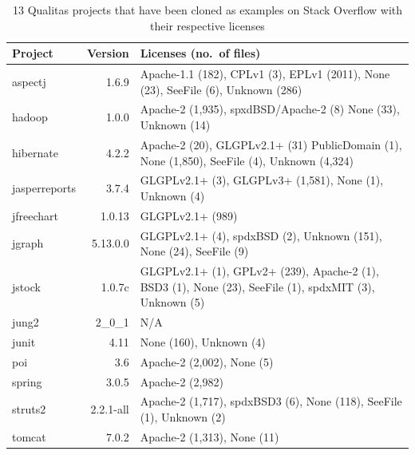 \documentclass{sig-alternate-05-2015}
\begin{document}
\begin{table}
	\centering
	\caption{13 Qualitas projects that have been cloned as examples on Stack Overflow with their respective licenses}
	\label{t:new_and_old}
	\small
	\begin{tabular}{l|r|p{4cm}}
		\hline 
		Project & Version & Licenses (no.~of files) \\
		\hline
		aspectj & 1.6.9 & Apache-1.1 (182), CPLv1 (3), \newline EPLv1 (2011), None (23), \newline SeeFile (6), Unknown (286) \\
		\hline
		hadoop & 1.0.0 & Apache-2 (1,935), \newline spxdBSD/Apache-2 (8) \newline None (33), Unknown (14) \\
		\hline
		hibernate & 4.2.2 & Apache-2 (20), \newline GLGPLv2.1+ (31) \newline PublicDomain (1), \newline None (1,850), SeeFile (4), \newline Unknown (4,324) \\
		\hline
		jasperreports & 3.7.4 & GLGPLv2.1+ (3), \newline GLGPLv3+ (1,581), \newline None (1), Unknown (4)\\
		\hline
		jfreechart & 1.0.13 & GLGPLv2.1+ (989) \\
		\hline
		jgraph & 5.13.0.0 & GLGPLv2.1+ (4), \newline spdxBSD (2), Unknown (151), \newline None (24), SeeFile (9) \\
		\hline
		jstock & 1.0.7c & GLGPLv2.1+ (1), \newline GPLv2+ (239), \newline Apache-2 (1), BSD3 (1), \newline None (23), SeeFile (1), \newline spdxMIT (3), Unknown (5)\\
		\hline
		jung2 & 2\_0\_1 & N/A \\
		\hline
		junit & 4.11 & None (160), Unknown (4)  \\
		\hline
		poi & 3.6 & Apache-2 (2,002), None (5) \\
		\hline
		spring & 3.0.5 & Apache-2 (2,982) \\
		\hline
		struts2 & 2.2.1-all & Apache-2 (1,717), \newline spdxBSD3 (6), \newline None (118), SeeFile (1), \newline Unknown (2) \\
		\hline
		tomcat & 7.0.2 & Apache-2 (1,313), None (11) \\
		\hline
	\end{tabular} %
\end{table}
			
\end{document}
